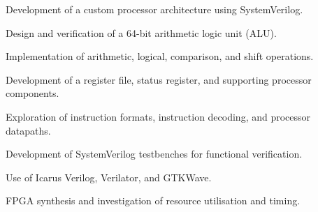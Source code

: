 \documentclass[english,a4paper]{europasscv}
\begin{document}
\begin{europasscv}
{\begin{ecvitemize}
    \item Development of a custom processor
    architecture using SystemVerilog.

    \item Design and verification of a
    64-bit arithmetic logic unit (ALU).

    \item Implementation of arithmetic,
    logical, comparison, and shift operations.

    \item Development of a register file,
    status register, and supporting
    processor components.

    \item Exploration of instruction formats,
    instruction decoding, and processor datapaths.

    \item Development of SystemVerilog
    testbenches for functional verification.

    \item Use of Icarus Verilog,
    Verilator, and GTKWave.

    \item FPGA synthesis and investigation
    of resource utilisation and timing.

\end{ecvitemize}
}





\end{europasscv}
\end{document}
